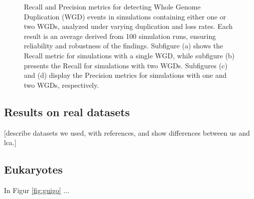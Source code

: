 \documentclass[10pt]{article}
\newcommand{\ml}[1]{\begingroup\color{blue}#1\endgroup}
\begin{document}
\begin{figure}[h!]
    \caption{
Recall and Precision metrics for detecting Whole Genome Duplication (WGD) events in simulations containing either one or two WGDs, analyzed under varying duplication and loss rates. Each result is an average derived from 100 simulation runs, ensuring reliability and robustness of the findings. Subfigure (a) shows the Recall metric for simulations with a single WGD, while subfigure (b) presents the Recall for simulations with two WGDs. Subfigures (c) and (d) display the Precision metrics for simulations with one and two WGDs, respectively.
    }
    \label{fig:recall-precision-wgd}
\end{figure}


\subsection{Results on real datasets}

\ml{[describe datasets we used, with references, and show differences between us and lca.]}
\subsection{Eukaryotes}
In Figur \ref{fig:guigo} ...
\end{document}
